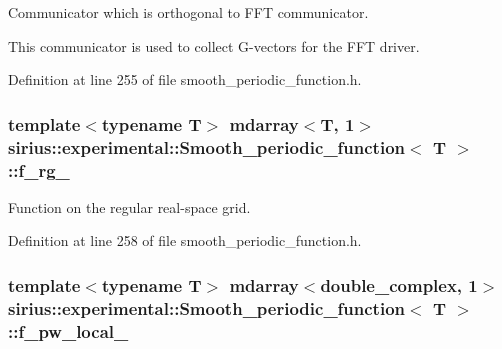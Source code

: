 Communicator which is orthogonal to F\+F\+T communicator. 

This communicator is used to collect G-\/vectors for the F\+F\+T driver. 

Definition at line 255 of file smooth\+\_\+periodic\+\_\+function.\+h.

\hypertarget{classsirius_1_1experimental_1_1_smooth__periodic__function_a67ff538738e5081c70be905593d66f7f}{}
\subsubsection[{f\+\_\+rg\+\_\+}]{\setlength{\rightskip}{0pt plus 5cm}template$<$typename T$>$ mdarray$<$T, 1$>$ {\bf sirius\+::experimental\+::\+Smooth\+\_\+periodic\+\_\+function}$<$ T $>$\+::f\+\_\+rg\+\_\+\hspace{0.3cm}{\ttfamily [protected]}}\label{classsirius_1_1experimental_1_1_smooth__periodic__function_a67ff538738e5081c70be905593d66f7f}


Function on the regular real-\/space grid. 



Definition at line 258 of file smooth\+\_\+periodic\+\_\+function.\+h.

\hypertarget{classsirius_1_1experimental_1_1_smooth__periodic__function_a928aab8f7cec0e58d30ffdfd825d2340}{}
\subsubsection[{f\+\_\+pw\+\_\+local\+\_\+}]{\setlength{\rightskip}{0pt plus 5cm}template$<$typename T$>$ mdarray$<$double\+\_\+complex, 1$>$ {\bf sirius\+::experimental\+::\+Smooth\+\_\+periodic\+\_\+function}$<$ T $>$\+::f\+\_\+pw\+\_\+local\+\_\+\hspace{0.3cm}{\ttfamily [protected]}}\label{classsirius_1_1experimental_1_1_smooth__periodic__function_a928aab8f7cec0e58d30ffdfd825d2340}


